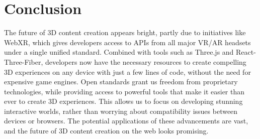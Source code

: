 \documentclass[11pt]{article}
\begin{document}
\section{Conclusion}
\label{sec:conclusion}

The future of 3D content creation appears bright, partly due to initiatives like WebXR, which gives developers access to APIs from all major VR/AR headsets under a single unified standard. Combined with tools such as Three.js and React-Three-Fiber, developers now have the necessary resources to create compelling 3D experiences on any device with just a few lines of code, without the need for expensive game engines. Open standards grant us freedom from proprietary technologies, while providing access to powerful tools that make it easier than ever to create 3D experiences. This allows us to focus on developing stunning interactive worlds, rather than worrying about compatibility issues between devices or browsers. The potential applications of these advancements are vast, and the future of 3D content creation on the web looks promising.

\pagebreak


\end{document}
